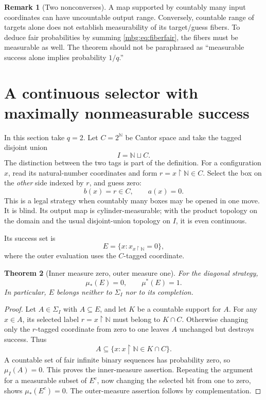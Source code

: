 \documentclass[11pt,letterpaper]{article}
\newtheorem{theorem}{Theorem}[section]
\theoremstyle{definition}
\newtheorem{remark}[theorem]{Remark}
\newcommand{\N}{\mathbb N}
\newcommand{\Sig}{\Sigma}
\newcommand{\restr}{\mathbin{\upharpoonright}}
\begin{document}
\begin{remark}[Two nonconverses]
A map supported by countably many input coordinates can have uncountable output range. Conversely, countable range of targets alone does not establish measurability of its target/guess fibers. To deduce fair probabilities by summing \eqref{mbg:eq:fiberfair}, the fibers must be measurable as well. The theorem should not be paraphrased as ``measurable success alone implies probability $1/q$.''
\end{remark}

\section{A continuous selector with maximally nonmeasurable success}
\label{mbg:sec:diagonal}

In this section take $q=2$. Let $C=2^\N$ be Cantor space and take the tagged disjoint union
\[
 I=\N\sqcup C.
\]
The distinction between the two tags is part of the definition. For a configuration $x$, read its natural-number coordinates and form $r=x\restr\N\in C$. Select the box on the \emph{other} side indexed by $r$, and guess zero:
\begin{equation}
 b(x)=r\in C,\qquad a(x)=0.
 \label{mbg:eq:diagonal}
\end{equation}
This is a legal strategy when countably many boxes may be opened in one move. It is blind. Its output map is cylinder-measurable; with the product topology on the domain and the usual disjoint-union topology on $I$, it is even continuous.

Its success set is
\[
 E=\{x:x_{x\restr\N}=0\},
\]
where the outer evaluation uses the $C$-tagged coordinate.

\begin{theorem}[Inner measure zero, outer measure one]
\label{mbg:thm:innerouter}
For the diagonal strategy,
\[
 \mu_*(E)=0,\qquad\mu^*(E)=1.
\]
In particular, $E$ belongs neither to $\Sig_I$ nor to its completion.
\end{theorem}
\begin{proof}
Let $A\in\Sig_I$ with $A\subseteq E$, and let $K$ be a countable support for $A$. For any $x\in A$, its selected label $r=x\restr\N$ must belong to $K\cap C$. Otherwise changing only the $r$-tagged coordinate from zero to one leaves $A$ unchanged but destroys success. Thus
\[
 A\subseteq\{x:x\restr\N\in K\cap C\}.
\]
A countable set of fair infinite binary sequences has probability zero, so $\mu_I(A)=0$. This proves the inner-measure assertion. Repeating the argument for a measurable subset of $E^c$, now changing the selected bit from one to zero, shows $\mu_*(E^c)=0$. The outer-measure assertion follows by complementation.
\end{proof}
\end{document}
